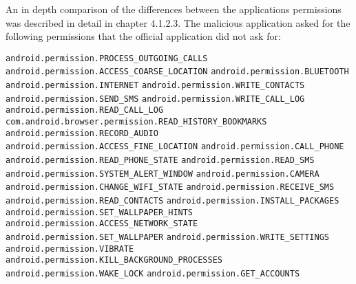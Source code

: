 An in depth comparison of the differences between the applications permissions was described in detail in chapter 4.1.2.3.
\newpage
{}
The malicious application asked for the following permissions that the official application did not ask for:

\texttt{android.permission.PROCESS\_OUTGOING\_CALLS}
\newline \texttt{android.permission.ACCESS\_COARSE\_LOCATION}
\newline \texttt{android.permission.BLUETOOTH}
\newline \texttt{android.permission.INTERNET}
\newline \texttt{android.permission.WRITE\_CONTACTS}
\newline \texttt{android.permission.SEND\_SMS}
\newline \texttt{android.permission.WRITE\_CALL\_LOG}
\newline \texttt{android.permission.READ\_CALL\_LOG}
\newline \texttt{com.android.browser.permission.READ\_HISTORY\_BOOKMARKS}
\newline \texttt{android.permission.RECORD\_AUDIO}
\newline \texttt{android.permission.ACCESS\_FINE\_LOCATION}
\newline \texttt{android.permission.CALL\_PHONE}
\newline \texttt{android.permission.READ\_PHONE\_STATE}
\newline \texttt{android.permission.READ\_SMS}
\newline \texttt{android.permission.SYSTEM\_ALERT\_WINDOW}
\newline \texttt{android.permission.CAMERA}
\newline \texttt{android.permission.CHANGE\_WIFI\_STATE}
\newline \texttt{android.permission.RECEIVE\_SMS}
\newline \texttt{android.permission.READ\_CONTACTS}
\newline \texttt{android.permission.INSTALL\_PACKAGES}
\newline \texttt{android.permission.SET\_WALLPAPER\_HINTS}
\newline \texttt{android.permission.ACCESS\_NETWORK\_STATE}
\newline \texttt{android.permission.SET\_WALLPAPER}
\newline \texttt{android.permission.WRITE\_SETTINGS}
\newline \texttt{android.permission.VIBRATE}
\newline \texttt{android.permission.KILL\_BACKGROUND\_PROCESSES}
\newline \texttt{android.permission.WAKE\_LOCK}
\newline \texttt{android.permission.GET\_ACCOUNTS}

